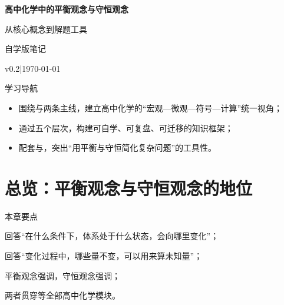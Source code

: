 \documentclass[a4paper,11pt]{ctexart}
\renewcommand{\notetitle}{高中化学中的平衡观念与守恒观念}
\renewcommand{\noteauthor}{自学版笔记}
\renewcommand{\notedate}{\today}
\renewcommand{\notesubtitle}{从核心概念到解题工具}
\renewcommand{\noteversion}{v0.2}
\begin{document}
\MathNoteEnablePrint

\thispagestyle{empty}
\setcounter{page}{1}

\noindent
\begin{minipage}[t][0.7\textheight][c]{\textwidth}
  \raggedleft
  \vspace*{\fill}
  {\sffamily\bfseries\Huge\color{accent}\notetitle\par}
  \vspace{0.6em}
  {\Large\color{inkgray}\notesubtitle\par}
  \vspace{0.5em}
  {\large\color{inkgray}\noteauthor\par}
  \vspace{0.4em}
  {\normalsize\color{inkgray}\noteversion\quad|\quad\notedate\par}
  \vspace*{\fill}
\end{minipage}

\begin{center}
\begin{minipage}{0.84\textwidth}
  \textcolor{inkgray}{\sffamily\small 学习导航}\\
  \begin{itemize}
    \item 围绕与两条主线，建立高中化学的“宏观—微观—符号—计算”统一视角；
    \item 通过五个层次，构建可自学、可复盘、可迁移的知识框架；
    \item 配套与，突出“用平衡与守恒简化复杂问题”的工具性。
  \end{itemize}
\end{minipage}
\end{center}
\vspace{1em}

\clearpage
\thispagestyle{plain}

\tableofcontents
\newpage


\section{总览：平衡观念与守恒观念的地位}

\begin{summarybox}{本章要点}
  \begin{focuspoints}
    \item {}回答“在什么条件下，体系处于什么状态，会向哪里变化”；
    \item {}回答“变化过程中，哪些量不变，可以用来算未知量”；
    \item 平衡观念强调，守恒观念强调；
    \item 两者贯穿等全部高中化学模块。
  \end{focuspoints}
\end{summarybox}
\end{document}
